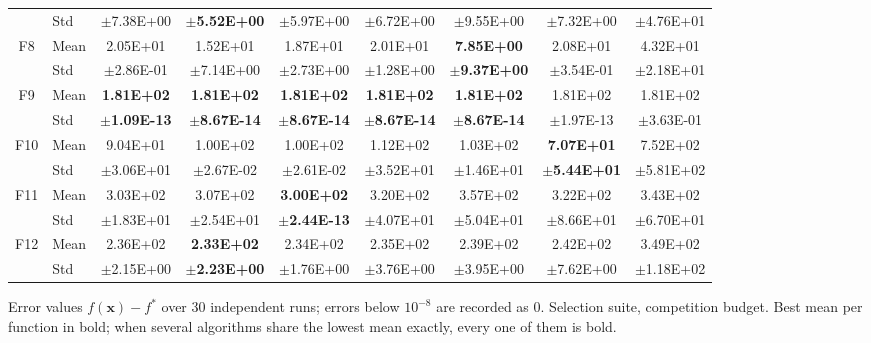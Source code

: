 \begin{table}[htbp]
{\begin{tabular}{clccccccc}
 & Std & $\pm$7.38E+00 & $\pm$\textbf{5.52E+00} & $\pm$5.97E+00 & $\pm$6.72E+00 & $\pm$9.55E+00 & $\pm$7.32E+00 & $\pm$4.76E+01 \\
F8 & Mean & 2.05E+01 & 1.52E+01 & 1.87E+01 & 2.01E+01 & \textbf{7.85E+00} & 2.08E+01 & 4.32E+01 \\
 & Std & $\pm$2.86E-01 & $\pm$7.14E+00 & $\pm$2.73E+00 & $\pm$1.28E+00 & $\pm$\textbf{9.37E+00} & $\pm$3.54E-01 & $\pm$2.18E+01 \\
F9 & Mean & \textbf{1.81E+02} & \textbf{1.81E+02} & \textbf{1.81E+02} & \textbf{1.81E+02} & \textbf{1.81E+02} & 1.81E+02 & 1.81E+02 \\
 & Std & $\pm$\textbf{1.09E-13} & $\pm$\textbf{8.67E-14} & $\pm$\textbf{8.67E-14} & $\pm$\textbf{8.67E-14} & $\pm$\textbf{8.67E-14} & $\pm$1.97E-13 & $\pm$3.63E-01 \\
F10 & Mean & 9.04E+01 & 1.00E+02 & 1.00E+02 & 1.12E+02 & 1.03E+02 & \textbf{7.07E+01} & 7.52E+02 \\
 & Std & $\pm$3.06E+01 & $\pm$2.67E-02 & $\pm$2.61E-02 & $\pm$3.52E+01 & $\pm$1.46E+01 & $\pm$\textbf{5.44E+01} & $\pm$5.81E+02 \\
F11 & Mean & 3.03E+02 & 3.07E+02 & \textbf{3.00E+02} & 3.20E+02 & 3.57E+02 & 3.22E+02 & 3.43E+02 \\
 & Std & $\pm$1.83E+01 & $\pm$2.54E+01 & $\pm$\textbf{2.44E-13} & $\pm$4.07E+01 & $\pm$5.04E+01 & $\pm$8.66E+01 & $\pm$6.70E+01 \\
F12 & Mean & 2.36E+02 & \textbf{2.33E+02} & 2.34E+02 & 2.35E+02 & 2.39E+02 & 2.42E+02 & 3.49E+02 \\
 & Std & $\pm$2.15E+00 & $\pm$\textbf{2.23E+00} & $\pm$1.76E+00 & $\pm$3.76E+00 & $\pm$3.95E+00 & $\pm$7.62E+00 & $\pm$1.18E+02 \\
\bottomrule
\end{tabular}}
\begin{flushleft}\footnotesize
Error values $f(\mathbf{x})-f^{*}$ over 30 independent runs; errors below $10^{-8}$ are recorded as 0. Selection suite, competition budget. Best mean per function in bold; when several algorithms share the lowest mean exactly, every one of them is bold.
\end{flushleft}
\end{table}
